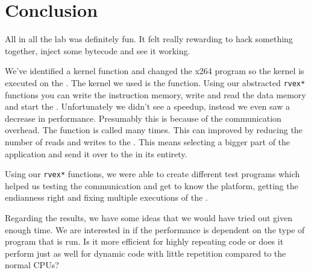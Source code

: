 \section{Conclusion}

All in all the lab was definitely fun. It felt really rewarding to hack
something together, inject some bytecode and see it working.

We've identified a kernel function and changed the x264 program so the kernel
is executed on the \rvex. The kernel we used is the \satd function. Using our
abstracted \texttt{rvex*} functions you can write the instruction memory, write
and read the data memory and start the \rvex. Unfortunately we didn't see a
speedup, instead we even saw a decrease in performance. Presumably this is
because of the communication overhead. The \satd function is called many times.
This can improved by reducing the number of reads and writes to the \rvex. This
means selecting a bigger part of the application and send it over to the
\rvex in its entirety.

Using our \texttt{rvex*} functions, we were able to create different test
programs which helped us testing the communication and get to know the
platform, getting the endianness right and fixing multiple executions of the
\rvex.

Regarding the results, we have some ideas that we would have tried out given
enough time. We are interested in if the \rvex performance is dependent on the
type of program that is run. Is it more efficient for highly repeating code or
does it perform just as well for dynamic code with little repetition compared
to the normal CPUs?
